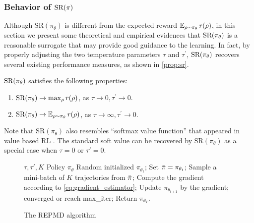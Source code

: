 \subsubsection{Behavior of $\text{SR}(\pi)$}
\label{subsec:sr}
Although $\text{SR}(\pi_\theta)$ is different from the expected reward $\operatorname*{\mathbb{E}}_{\rho \sim \pi_\theta}{r(\rho)}$,  in this section we present some theoretical and empirical evidences that $\text{SR}(\pi_\theta)$ is a reasonable surrogate that may provide good guidance to the learning. 
In fact, by properly adjusting the two temperature parameters $\tau$ and $\tau^{\prime}$, $\text{SR}(\pi_\theta)$ recovers several existing performance measures, as shown in \cref{prop:sr}.
\begin{prop}
\label{prop:sr}
$\text{SR}(\pi_\theta)$ satisfies the following properties:
\begin{enumerate}[label=(\roman*)]
	\item  $\text{SR}(\pi_\theta) \to \max_{\rho}{r(\rho)}$, as $\tau \to 0, \tau^{\prime} \to 0$.
	\item $\text{SR}(\pi_\theta) \to \operatorname*{\mathbb{E}}_{\rho \sim \pi_\theta}{r(\rho)}$, as $\tau \to \infty, \tau^{\prime} \to 0$. 
\end{enumerate}	
\end{prop}
\begin{remk}
	Note that $\text{SR}(\pi_\theta)$ also resembles ``softmax value function'' that appeared in value based RL \citep{nachum2017bridging,haarnoja2018soft,ding2017cold}. The standard soft value can be recovered by $\text{SR}(\pi_\theta)$ as a special case when $\tau = 0$ or $\tau'=0$. 
\end{remk}

\begin{figure}
	\begin{minipage}{0.56\textwidth}
		\begin{algorithm}[H]
			\caption{\label{alg:repmd}  The REPMD algorithm}
			\begin{algorithmic}[1]
				\INPUT $\tau, \tau', K$
				\OUTPUT  Policy $\pi_\theta$
				\STATE Random initialized $\pi_{\theta_1}$;
				\STATE Set $\bar{\pi} = \pi_{\theta_t}$;
				\REPEAT 
				\STATE Sample a mini-batch of $K$ trajectories from $\bar{\pi}$;
				\STATE Compute the gradient according to \cref{eq:gradient_estimator};
				\STATE Update $\pi_{\theta_{t+1}}$ by the gradient;
				\UNTIL converged or reach max\_iter;
				\ENDFOR
				\STATE Return $\pi_{\theta_T}$.
			\end{algorithmic}
		\end{algorithm}
	\end{minipage}
\end{figure}

